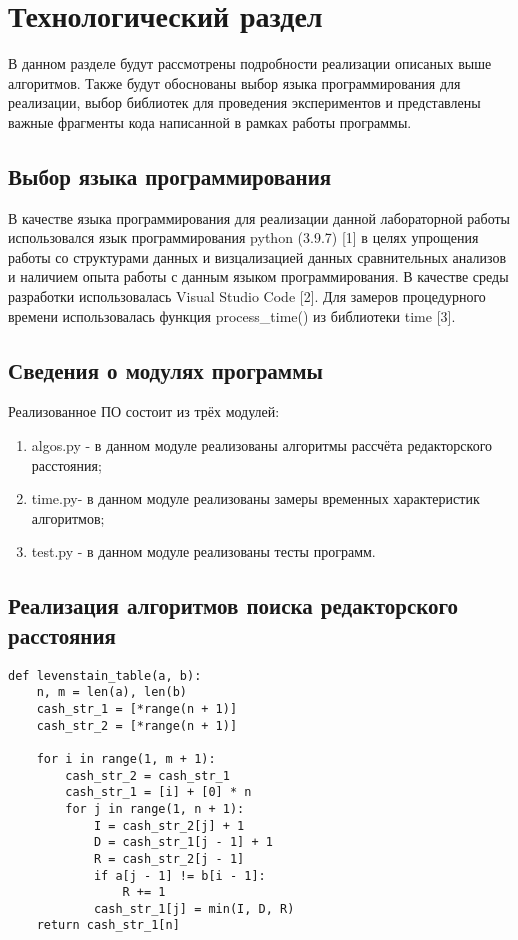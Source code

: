 \chapter{Технологический раздел}

В данном разделе будут рассмотрены подробности реализации описаных выше алгоритмов. Также будут обоснованы выбор языка программирования для реализации, выбор библиотек для проведения экспериментов и представлены важные фрагменты кода написанной в рамках работы программы.

\section{Выбор языка программирования}

В качестве языка программирования для реализации данной лабораторной работы использовался язык программирования python (3.9.7) [1] в целях упрощения работы со структурами данных и визцализацией данных сравнительных анализов и наличием опыта работы с данным языком программирования. В качестве среды разработки использовалась Visual Studio Code [2]. Для замеров процедурного времени использовалась функция process\_time() из библиотеки time [3].

\section{Сведения о модулях программы}

Реализованное ПО состоит из трёх модулей:
\begin{enumerate}
	\item algos.py - в данном модуле реализованы алгоритмы рассчёта редакторского расстояния;
	\item time.py- в данном модуле реализованы замеры временных характеристик алгоритмов;
	\item test.py - в данном модуле реализованы тесты программ.
\end{enumerate}

\section{Реализация алгоритмов поиска редакторского расстояния}

\begin{lstlisting}[label=some-code-1,caption=Реализация нерекурсивного алгоритма поиска расстояния Левенштейна табличным способом.]
def levenstain_table(a, b):
    n, m = len(a), len(b)
    cash_str_1 = [*range(n + 1)]
    cash_str_2 = [*range(n + 1)]

    for i in range(1, m + 1):
        cash_str_2 = cash_str_1
        cash_str_1 = [i] + [0] * n
        for j in range(1, n + 1):
            I = cash_str_2[j] + 1
            D = cash_str_1[j - 1] + 1
            R = cash_str_2[j - 1]
            if a[j - 1] != b[i - 1]:
                R += 1
            cash_str_1[j] = min(I, D, R)
    return cash_str_1[n]
\end{lstlisting}

